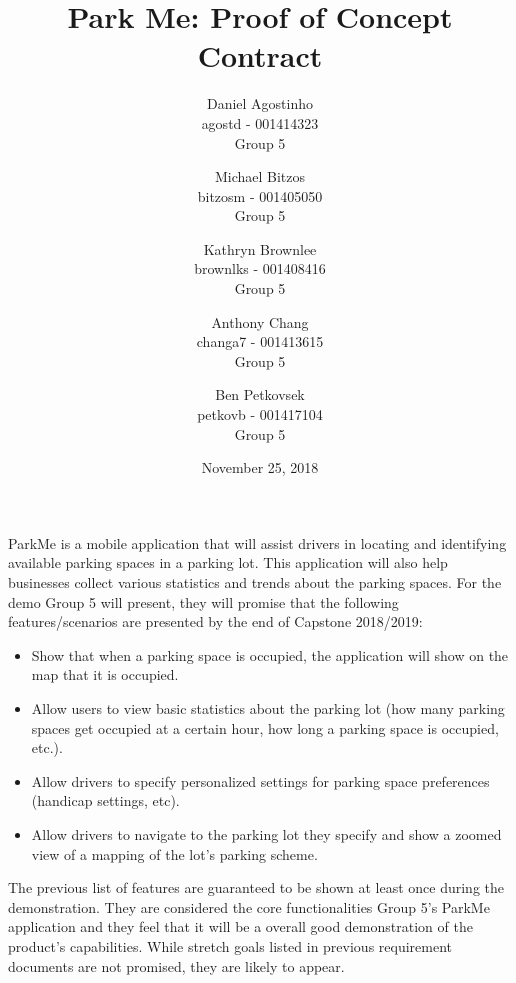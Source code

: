 \documentclass[]{article}
\title{Park Me: Proof of Concept Contract}
\author{Daniel Agostinho\\agostd - 001414323\\ Group 5 \and Michael Bitzos\\bitzosm - 001405050\\ Group 5 \and Kathryn Brownlee\\brownlks - 001408416\\ Group 5  \and Anthony Chang\\changa7 - 001413615\\ Group 5 \and Ben Petkovsek\\petkovb - 001417104\\ Group 5}
\begin{document}
\date{November 25, 2018}
\maketitle


ParkMe is a mobile application that will assist drivers in locating and identifying available parking spaces in a parking lot. This application will also help businesses collect various statistics and trends about the parking spaces. For the demo Group 5 will present, they will promise that the following features/scenarios are presented by the end of Capstone 2018/2019:

\begin{itemize}
	\item Show that when a parking space is occupied, the application will show on the map that it is occupied.
	
	\item Allow users to view basic statistics about the parking lot (how many parking spaces get occupied at a certain hour, how long a parking space is occupied, etc.).
	
	\item Allow drivers to specify personalized settings for parking space preferences (handicap settings, etc).
	
	\item Allow drivers to navigate to the parking lot they specify and show a zoomed view of a mapping of the lot’s parking scheme.
\end{itemize}

The previous list of features are guaranteed to be shown at least once during the demonstration. They are considered the core functionalities Group 5’s ParkMe application and they feel that it will be a overall good demonstration of the product’s capabilities. While stretch goals listed in previous requirement documents are not promised, they are likely to appear. 
\end{document}

